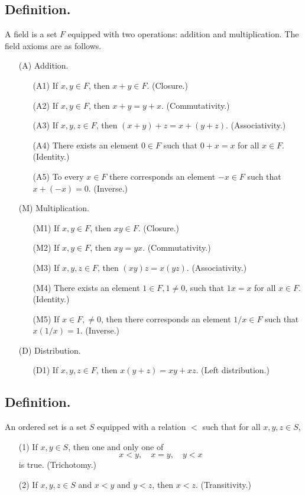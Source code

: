 \documentclass[titlepage]{article}
\begin{document}
\subsection{Definition.} A field is a set $F$ equipped with two operations: addition and multiplication. The field axioms are as follows.
\begin{enumerate}
\item[(A)] Addition.
    \begin{enumerate}
    \item[(A1)] If $x,y \in F$, then $x+y \in F$. (Closure.)
    \item[(A2)] If $x,y \in F$, then $x+y = y+x$. (Commutativity.)
    \item[(A3)] If $x,y,z \in F$, then $(x+y)+z = x+(y+z)$. (Associativity.)
    \item[(A4)] There exists an element $0 \in F$ such that $0 + x = x$ for all $x \in F$. (Identity.)
    \item[(A5)] To every $x \in F$ there corresponds an element $-x \in F$ such that $x + (-x) = 0$. (Inverse.)
    \end{enumerate}
\item[(M)] Multiplication.
    \begin{enumerate}
    \item[(M1)] If $x,y \in F$, then $xy \in F$. (Closure.)
    \item[(M2)] If $x,y \in F$, then $xy = yx$. (Commutativity.)
    \item[(M3)] If $x,y,z \in F$, then $(xy)z = x(yz)$. (Associativity.)
    \item[(M4)] There exists an element $1 \in F, 1 \neq 0$, such that $1x = x$ for all $x \in F$. (Identity.)
    \item[(M5)] If $x \in F, \neq 0$, then there corresponds an element $1/x \in F$ such that $x(1/x) = 1$. (Inverse.)
    \end{enumerate}
\item[(D)] Distribution.
    \begin{enumerate}
    \item[(D1)] If $x,y,z \in F$, then $x(y+z) = xy + xz$. (Left distribution.)
    \end{enumerate}
\end{enumerate}

\subsection{Definition.} An ordered set is a set $S$ equipped with a relation $<$ such that for all $x,y,z \in S$,
\begin{enumerate}
\item[(1)] If $x,y \in S$, then one and only one of 
$$x < y, \quad x = y, \quad y < x$$
is true. (Trichotomy.)
\item[(2)] If $x,y,z \in S$ and $x < y$ and $y < z$, then $x < z$. (Transitivity.)
\end{enumerate}
\end{document}
